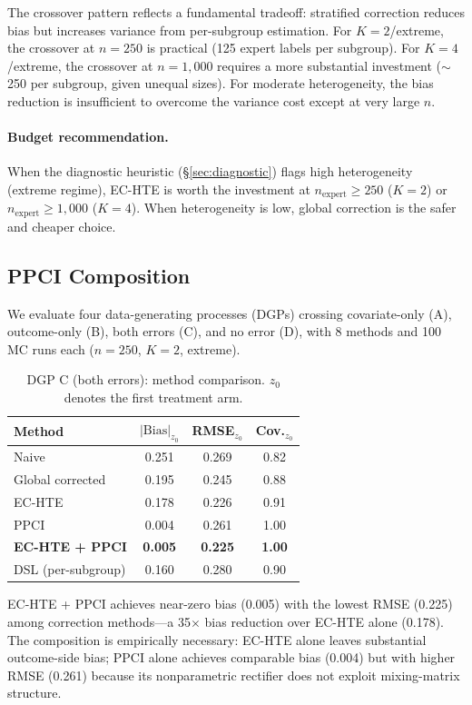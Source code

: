\documentclass[11pt,a4paper]{article}
\begin{document}
The crossover pattern reflects a fundamental tradeoff: stratified correction reduces bias but increases variance from per-subgroup estimation.
For $K=2$/extreme, the crossover at $n=250$ is practical (125 expert labels per subgroup).
For $K=4$/extreme, the crossover at $n=1{,}000$ requires a more substantial investment ($\sim$250 per subgroup, given unequal sizes).
For moderate heterogeneity, the bias reduction is insufficient to overcome the variance cost except at very large $n$.

\paragraph{Budget recommendation.}
When the diagnostic heuristic (\S\ref{sec:diagnostic}) flags high heterogeneity (extreme regime), EC-HTE is worth the investment at $n_{\text{expert}} \geq 250$ ($K=2$) or $n_{\text{expert}} \geq 1{,}000$ ($K=4$).
When heterogeneity is low, global correction is the safer and cheaper choice.


\subsection{PPCI Composition}\label{sec:ppci_exp}

We evaluate four data-generating processes (DGPs) crossing covariate-only (A), outcome-only (B), both errors (C), and no error (D), with 8 methods and 100 MC runs each ($n=250$, $K=2$, extreme).

\begin{table}[t]
\centering
\small
\caption{DGP C (both errors): method comparison. $z_0$ denotes the first treatment arm.}
\label{tab:ppci}
\begin{tabular}{@{}lccc@{}}
\toprule
Method & $|\text{Bias}|_{z_0}$ & RMSE$_{z_0}$ & Cov.$_{z_0}$ \\
\midrule
Naive & 0.251 & 0.269 & 0.82 \\
Global corrected & 0.195 & 0.245 & 0.88 \\
EC-HTE & 0.178 & 0.226 & 0.91 \\
PPCI & 0.004 & 0.261 & 1.00 \\
\textbf{EC-HTE + PPCI} & \textbf{0.005} & \textbf{0.225} & \textbf{1.00} \\
DSL (per-subgroup) & 0.160 & 0.280 & 0.90 \\
\bottomrule
\end{tabular}
\end{table}

EC-HTE + PPCI achieves near-zero bias (0.005) with the lowest RMSE (0.225) among correction methods---a 35$\times$ bias reduction over EC-HTE alone (0.178).
The composition is empirically necessary: EC-HTE alone leaves substantial outcome-side bias; PPCI alone achieves comparable bias (0.004) but with higher RMSE (0.261) because its nonparametric rectifier does not exploit mixing-matrix structure.
\end{document}
